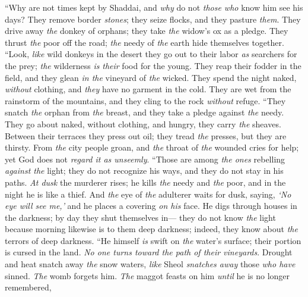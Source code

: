 \begin{biblechapter} %
 “Why are not times kept by Shaddai, 
and \textit{why} do not \textit{those who} know him see his days?
\verse They remove border \textit{stones}; 
they seize flocks, and they pasture \textit{them}.
\verse They drive away \textit{the} donkey of orphans; 
they take \textit{the} widow’s ox as a pledge.
\verse They thrust \textit{the} poor off the road; 
\textit{the} needy of \textit{the} earth hide themselves together.
\verse “Look, \textit{like} wild donkeys in the desert 
they go out to their labor \textit{as} searchers for the prey; 
\textit{the} wilderness \textit{is} \textit{their} food for the young.
\verse They reap their fodder in the field, 
and they glean \textit{in the} vineyard of \textit{the} wicked.
\verse They spend the night naked, \textit{without} clothing, 
and \textit{they} have no garment in the cold.
\verse They are wet from the rainstorm of the mountains, 
and they cling to the rock \textit{without} refuge.
\verse “They snatch \textit{the} orphan from \textit{the} breast, 
and they take a pledge against \textit{the} needy.
\verse They go about naked, without clothing, 
and hungry, they carry \textit{the} sheaves.
\verse Between their terraces they press out oil; 
they tread \textit{the} presses, but they are thirsty.
\verse From \textit{the} city people groan, 
and \textit{the} throat of \textit{the} wounded cries for help; 
yet God does not \textit{regard it as unseemly}.
\verse “Those are among \textit{the ones} rebelling \textit{against the} light; 
they do not recognize his ways, 
and they do not stay in his paths.
\verse \textit{At dusk} the murderer rises; 
he kills \textit{the} needy and \textit{the} poor, 
and in the night he is like a thief.
\verse And \textit{the} eye of \textit{the} adulterer waits for dusk, 
saying, \textit{‘No eye will see me,’} 
and he places a covering \textit{on his} face.
\verse He digs through houses in the darkness; 
by day they shut themselves in— 
they do not know \textit{the} light
\verse because morning likewise is to them deep darkness; 
indeed, they know about \textit{the} terrors of deep darkness.
\verse “He himself \textit{is} swift on \textit{the} water’s surface; 
their portion is cursed in the land. 
\textit{No one turns toward the path of their vineyards}.
\verse Drought and heat snatch away \textit{the} snow waters, 
\textit{like} Sheol \textit{snatches away} those \textit{who have} sinned.
\verse \textit{The} womb forgets him. 
\textit{The} maggot feasts on him \textit{until} he is no longer remembered, 

\end{biblechapter}
